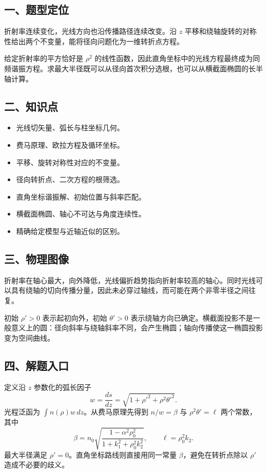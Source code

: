 \documentclass[12pt,a4paper,fontset=fandol]{ctexart}
\providecommand{\tightlist}{\setlength{\itemsep}{0pt}\setlength{\parskip}{0pt}}
\begin{document}
\subsection{一、题型定位}\label{ux4e00ux9898ux578bux5b9aux4f4d-6}

折射率连续变化，光线方向也沿传播路径连续改变。沿 \(z\)
平移和绕轴旋转的对称性给出两个不变量，能将径向问题化为一维转折点方程。

给定折射率的平方恰好是 \(\rho^2\)
的线性函数，因此直角坐标中的光线方程最终成为同频谐振方程。求最大半径既可以从径向首次积分选根，也可以从横截面椭圆的长半轴计算。

\subsection{二、知识点}\label{ux4e8cux77e5ux8bc6ux70b9-6}

\begin{itemize}
\tightlist
\item
  光线切矢量、弧长与柱坐标几何。
\item
  费马原理、欧拉方程及循环坐标。
\item
  平移、旋转对称性对应的不变量。
\item
  径向转折点、二次方程的根筛选。
\item
  直角坐标谐振解、初始位置与斜率匹配。
\item
  横截面椭圆、轴心不可达与角度连续性。
\item
  精确给定模型与近轴近似的区别。
\end{itemize}

\subsection{三、物理图像}\label{ux4e09ux7269ux7406ux56feux50cf-6}

折射率在轴心最大，向外降低，光线偏折趋势指向折射率较高的轴心。同时光线可以具有绕轴的切向传播分量，因此未必穿过轴线，而可能在两个非零半径之间往复。

初始 \(\rho'>0\) 表示起初向外，初始 \(\theta'>0\)
表示绕轴方向已确定。横截面投影不是一般意义上的圆：径向斜率与绕轴斜率不同，会产生椭圆；轴向传播使这一椭圆投影变为空间曲线。

\subsection{四、解题入口}\label{ux56dbux89e3ux9898ux5165ux53e3-6}

定义沿 \(z\) 参数化的弧长因子 \[
w=\frac{ds}{dz}=\sqrt{1+\rho'^2+\rho^2\theta'^2}.
\] 光程泛函为 \(\int n(\rho)w\,dz\)。从费马原理先得到 \(n/w=\beta\) 与
\(\rho^2\theta'=\ell\) 两个常数，其中 \[
\beta=n_0\sqrt{\frac{1-\alpha^2\rho_0^2}
{1+k_1^2+\rho_0^2k_2^2}},\qquad
\ell=\rho_0^2k_2.
\] 最大半径满足 \(\rho'=0\)。直角坐标路线则直接用同一常量
\(\beta\)，避免在转折点除以 \(\rho'\) 造成不必要的歧义。
\end{document}
